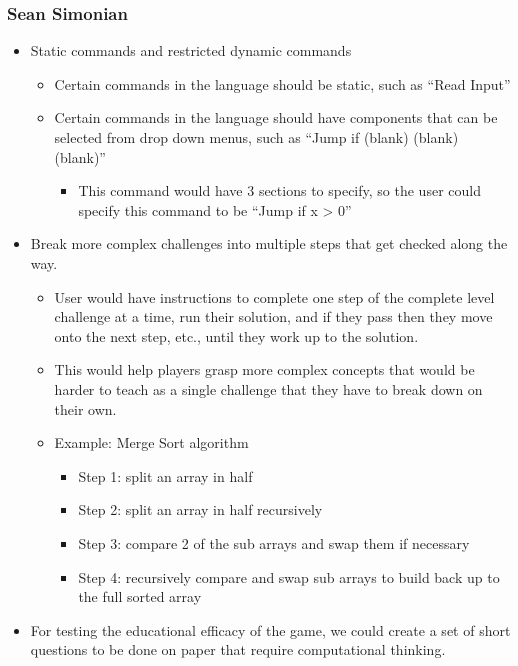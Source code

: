 \documentclass{article}
\begin{document}
\subsubsection{Sean Simonian}
\begin{itemize}
  \item Static commands and restricted dynamic commands
  \begin{itemize}
    \item Certain commands in the language should be static, such as “Read
    Input”
    \item Certain commands in the language should have components that can be
    selected from drop down menus, such as “Jump if (blank) (blank) (blank)”
    \begin{itemize}
      \item This command would have 3 sections to specify, so the user could
      specify this command to be “Jump if x > 0”
    \end{itemize}
  \end{itemize}
  \item Break more complex challenges into multiple steps that get checked along
  the way.
  \begin{itemize}
    \item User would have instructions to complete one step of the complete
    level challenge at a time, run their solution, and if they pass then they
    move onto the next step, etc., until they work up to the solution.
    \item This would help players grasp more complex concepts that would be
    harder to teach as a single challenge that they have to break down on their
    own.
    \item Example: Merge Sort algorithm
    \begin{itemize}
      \item Step 1: split an array in half
      \item Step 2: split an array in half recursively
      \item Step 3: compare 2 of the sub arrays and swap them if necessary
      \item Step 4: recursively compare and swap sub arrays to build back up to
      the full sorted array
    \end{itemize}
  \end{itemize}
  \item For testing the educational efficacy of the game, we could create a set
  of short questions to be done on paper that require computational thinking.

\end{itemize}
\end{document}
